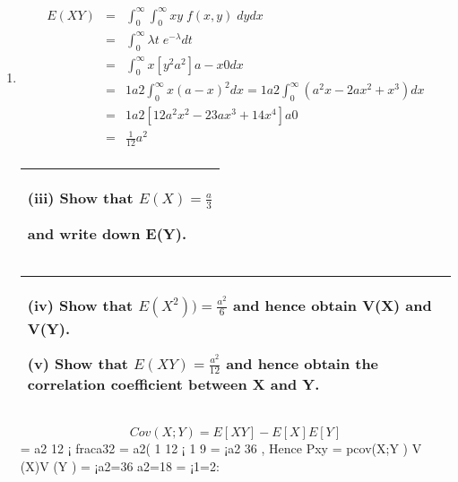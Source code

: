 \documentclass[a4paper,12pt]{article}
\begin{document}
\begin{enumerate}
\begin{table}[ht!]
\begin{tabular}{|p{15cm}|}
      \end{tabular}
    \end{table}

\item 

\begin{eqnarray}
E(XY) &=& \int^{\infty}_{0} \int^{\infty}_{0} xy\; f(x,y) \; dydx \\
    &=&\int^{\infty}_{0} \lambda t\;e^{-\lambda} dt \\
&=&
\int^{\infty}_{0} x[ y^2
a^2 ]a-x
0 dx \\ &=& 1
a2
\int^{\infty}_{0} x(a - x)^2dx = 1
a2
\int^{\infty}_{0}(a^2x - 2ax^2 + x^3)dx\\
&=& 1
a2 [ 1
2a^2x^2 - 2
3ax^3 + 1
4x^4]a
0\\ &=& \frac{1}{12}a^2\\
\end{eqnarray}
\newpage
  \begin{table}[ht!]
     \centering
     \begin{tabular}{|p{15cm}|}
     \hline    
(iii) Show that $E(X) = \frac{a}{3}$

 and write down E(Y).         
\\ \hline
\end{tabular}
\end{table}

  \begin{table}[ht!]
     \centering
     \begin{tabular}{|p{15cm}|}
     \hline  
 (iv) Show that $E(X^2)) = \frac{a^2}{6}$
and hence obtain V(X) and V(Y).       
 
(v) Show that $E(XY) = \frac{a^2}{12}$
and hence obtain the correlation coefficient 
between X and Y.\\ \hline
\end{tabular}
\end{table}
\[Cov(X; Y ) = E[XY ] - E[X]E[Y ]\] = a2
12 ¡ fraca32 = a2( 1
12 ¡ 1
9 = ¡a2
36 ,
Hence Pxy = pcov(X;Y )
V (X)V (Y )
= ¡a2=36
a2=18 = ¡1=2:
\end{enumerate}
\end{document}
